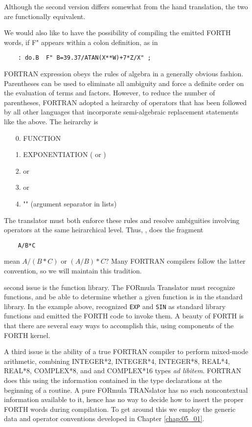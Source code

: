 Although the second version differs somewhat from the hand translation, the two are functionally equivalent.

We would also like to have the possibility of compiling the emitted FORTH words, if F" appears within a colon definition, as in

\begin{lstlisting}
    : do.B  F" B=39.37/ATAN(X**W)+7*Z/X" ;
\end{lstlisting}

 FORTRAN expression obeys the rules of algebra in a generally obvious fashion. Parentheses can be used to eliminate all ambiguity and force a definite order on the evaluation of terms and factors. However, to reduce the number of parentheses, FORTRAN adopted a heirarchy of operators that has been followed by all other languages that incorporate semi-algebraic replacement statements like the above. The heirarchy is

\begin{enumerate}
    \item[0.] FUNCTION
    \item[1.] EXPONENTIATION ( \bc{^} or \bc{**})
    \item[2.] \bc{*} or \bc{/}
    \item[3.] \bc{+} or \bc{-}
    \item[4.] "\bc{,}" (argument separator in lists)
\end{enumerate}

The translator must both enforce these rules and resolve ambiguities involving operators at the same heirarchical level. Thus, \eg, does the fragment

\begin{lstlisting}
    A/B*C
\end{lstlisting}

mean $A/(B*C)$ or $(A/B)*C$? Many FORTRAN compilers follow the latter convention, so we will maintain this tradition.

 second issue is the function library. The FORmula Translator must recognize functions, and be able to determine whether a given function is in the standard library. In the example above,  recognized \texttt{EXP} and \texttt{SIN} as standard library functions and emitted the FORTH code to invoke them. A beauty of FORTH is that there are several easy ways to accomplish this, using components of the FORTH kernel.

A third issue is the ability of a true FORTRAN compiler to perform mixed-mode arithmetic, combining INTEGER*2, INTEGER*4, INTEGER*8, REAL*4, REAL*8, COMPLEX*8, and 
and COMPLEX*16 types \textit{ad libitem}. FORTRAN does this using the information contained in the type declarations at the beginning of a routine. A pure FORmula TRANslator has no such noncontextual information available to it, hence has no way to decide how to insert the proper FORTH words during compilation. To get around this we employ the generic data and operator conventions developed in Chapter \ref{chap:05_01}.

